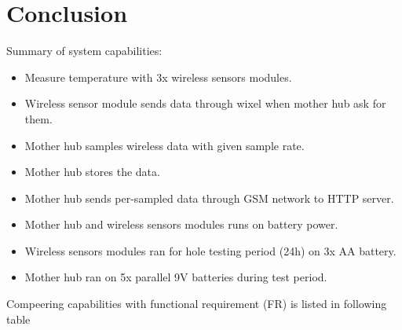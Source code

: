 \section*{Conclusion}
Summary of system capabilities:
\begin{itemize}
	\item Measure temperature with 3x wireless sensors modules.
	\item Wireless sensor module sends data through wixel when mother hub ask for them.
	\item Mother hub samples wireless data with given sample rate.
	\item Mother hub stores the data.
	\item Mother hub sends per-sampled data through GSM network to HTTP server.
	\item Mother hub and wireless sensors modules runs on battery power.
	\item Wireless sensors modules ran for hole testing period (24h) on 3x AA battery.
	\item Mother hub ran on 5x parallel 9V batteries during test period.
\end{itemize}
 
 Compeering capabilities with functional requirement (FR) is listed in following table 
 
